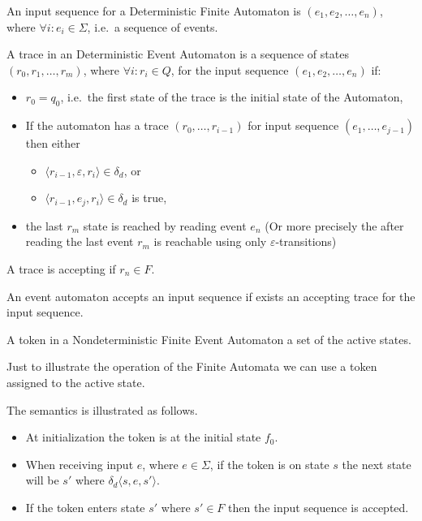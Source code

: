 		\begin{dfn}
			\label{dfn:cep:ea:inputseq}
			An input sequence for a Deterministic Finite Automaton is $(e_1, e_2, \dots, e_n )$, where $\forall i : e_i \in \Sigma$, i.e.~a sequence of events.
		\end{dfn}
	
		\begin{dfn}
			\label{dfn:cep:ea:trace}
			A trace in an Deterministic Event Automaton is
			a sequence of states $(r_0, r_1, \dots, r_m)$, where $\forall i: r_i \in Q$,
			for the input sequence $(e_1, e_2, \dots, e_n)$ if:
			\begin{itemize}
				\item $r_0 = q_0$, i.e.~the first state of the trace is the initial state of the Automaton,
				\item If the automaton has a trace $(r_0,\dots,r_{i-1})$ for input sequence $(e_1,\dots,e_{j-1})$ then either
				\begin{itemize} 
					\item $\langle r_{i-1}, \varepsilon, r_i \rangle \in \delta_d$, or
					\item  $\langle r_{i-1}, e_j, r_i \rangle \in \delta_d$ is true,
				\end{itemize}
				\item the last $r_m$ state is reached by reading event $e_n$ (Or more precisely the after reading the last event $r_m$ is reachable using only
				$\varepsilon$-transitions)
			\end{itemize}
			A trace is accepting if $r_n \in F$.
		\end{dfn}
	
		\begin{dfn}
			\label{dfn:cep:ea:accepting}
			An event automaton accepts an input sequence if exists an accepting trace for the input sequence.
		\end{dfn}
	
		\begin{dfn}
			\label{dfn:cep:ea:token}
			A token in a Nondeterministic Finite Event Automaton a set of the active states.
		\end{dfn}
		
		Just to illustrate the operation of the Finite Automata we can use a token assigned to the active state.

		The semantics is illustrated as follows. 
		\begin{itemize}
			\item At initialization the token is at the initial state $f_0$.
			\item When receiving input $e$, where $e \in \Sigma$, if the token is on state $s$ the next state will be $s'$ where
			$\delta_d \langle s,e,s' \rangle$.%
			\item If the token enters state $s'$ where $s' \in F$ then the input sequence is accepted. 			
		\end{itemize}


